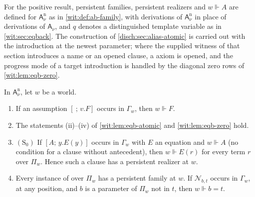 For the positive result, persistent families, persistent realizers and
$w\Vdash A$ are defined for $\mathsf{A}^{\mathrm n}_{\nu}$ as in
\cref{wit:def:ab-family}, with derivations of $\mathsf{A}^{\mathrm n}_{\nu}$
in place of derivations of $\mathsf{A}_{\nu}$, and $q$ denotes a
distinguished template variable as in \cref{wit:sec:eqback}.  The
construction of \cref{disch:sec:alias-atomic} is carried out with the
introduction at the newest parameter; where the supplied witness of that
section introduces a name or an opened clause, a  axiom is
opened, and the progress mode of a target introduction is handled by the
diagonal zero rows of \cref{wit:lem:eqb-zero}.

\begin{lemma}
\label{wit:lem:ns-base}
In $\mathsf{A}^{\mathrm n}_{\nu}$, let $w$ be a world.
\begin{enumerate}[label=\textup{(\roman*)}]
\item If an assumption $[\ ;\,v.F]$ occurs in $\Gamma_w$, then $w\Vdash F$.
\item The statements (ii)--(iv) of \cref{wit:lem:eqb-atomic} and
 \cref{wit:lem:eqb-zero} hold.
\item $(\mathrm S_0)$ If $[A;\,y.E(y)]$ occurs in $\Gamma_w$ with $E$ an
 equation and $w\Vdash A$ (no condition for a clause without antecedent),
 then $w\Vdash E(r)$ for every term $r$ over $\Pi_w$.  Hence such a clause
 has a persistent realizer at $w$.
\item Every instance of  over $\Pi_w$ has a persistent
 family at $w$.  If $\mathcal N_{b,t}$ occurs in $\Gamma_w$, at any position,
 and $b$ is a parameter of $\Pi_w$ not in $t$, then $w\Vdash b=t$.
\end{enumerate}
\end{lemma}

